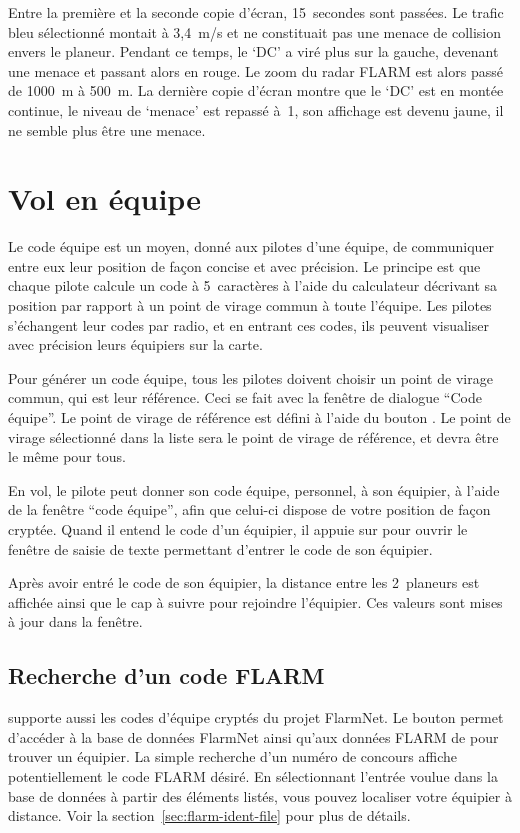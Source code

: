 Entre la première et la seconde copie d'écran, 15~secondes sont passées. Le trafic bleu sélectionné montait à 3,4~m/s et ne constituait pas une menace de collision envers le planeur. Pendant ce temps, le `DC' a viré plus sur la gauche, devenant une menace et passant alors en rouge. Le zoom du radar FLARM est alors passé de 1000~m à 500~m. La dernière copie d'écran montre que le `DC' est en montée continue, le niveau de `menace' est repassé à~1, son affichage est devenu jaune, il ne semble plus être une menace.


\section{Vol en équipe}\label{sec:team-flying}

Le code équipe est un moyen, donné aux pilotes d'une équipe, de communiquer entre eux leur position de façon concise et avec précision. Le principe est que chaque pilote calcule un code à 5~caractères à l'aide du calculateur décrivant sa position par rapport à un point de virage commun à toute l'équipe. Les pilotes s'échangent leur codes par radio, et en entrant ces codes, ils peuvent visualiser avec précision leurs équipiers sur la carte.

Pour générer un code équipe, tous les pilotes doivent choisir un point de virage commun, qui est leur référence. Ceci se fait avec la fenêtre de dialogue ``Code équipe''.
Le point de virage de référence est défini à l'aide du bouton .
Le point de virage sélectionné dans la liste sera le point de virage de référence, et devra être le même pour tous.

En vol, le pilote peut donner son code équipe, personnel, à son équipier, à l'aide de la fenêtre ``code équipe'', afin que celui-ci dispose de votre position de façon cryptée. Quand il entend le code d'un équipier, il appuie sur  pour ouvrir le fenêtre de saisie de texte permettant d'entrer le code de son équipier.


Après avoir entré le code de son équipier, la distance entre les 2~planeurs est affichée ainsi que le cap à suivre pour rejoindre l'équipier. Ces valeurs sont mises à jour dans la fenêtre.

\subsection*{Recherche d'un code FLARM}
\xc{} supporte aussi les codes d'équipe cryptés du projet FlarmNet. Le bouton 
permet d'accéder à la base de données FlarmNet ainsi qu'aux données FLARM de \xc{} pour trouver un équipier. La simple recherche d'un numéro de concours affiche potentiellement le code FLARM désiré. En sélectionnant l'entrée voulue dans la base de données à partir des éléments listés, vous pouvez localiser votre équipier à distance. Voir la section~\ref{sec:flarm-ident-file} pour plus de détails.

